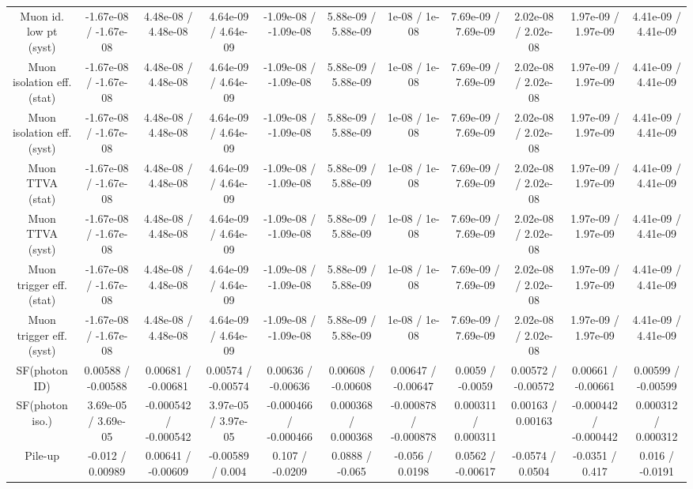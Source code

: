 \begin{table}[htbp]
\begin{center}
\begin{tabular}{|c|c|c|c|c|c|c|c|c|c|c|}
  Muon id. low pt (syst) & -1.67e-08 / -1.67e-08 & 4.48e-08 / 4.48e-08 & 4.64e-09 / 4.64e-09 & -1.09e-08 / -1.09e-08 & 5.88e-09 / 5.88e-09 & 1e-08 / 1e-08 & 7.69e-09 / 7.69e-09 & 2.02e-08 / 2.02e-08 & 1.97e-09 / 1.97e-09 & 4.41e-09 / 4.41e-09 \\ 
  Muon isolation eff. (stat) & -1.67e-08 / -1.67e-08 & 4.48e-08 / 4.48e-08 & 4.64e-09 / 4.64e-09 & -1.09e-08 / -1.09e-08 & 5.88e-09 / 5.88e-09 & 1e-08 / 1e-08 & 7.69e-09 / 7.69e-09 & 2.02e-08 / 2.02e-08 & 1.97e-09 / 1.97e-09 & 4.41e-09 / 4.41e-09 \\ 
  Muon isolation eff. (syst) & -1.67e-08 / -1.67e-08 & 4.48e-08 / 4.48e-08 & 4.64e-09 / 4.64e-09 & -1.09e-08 / -1.09e-08 & 5.88e-09 / 5.88e-09 & 1e-08 / 1e-08 & 7.69e-09 / 7.69e-09 & 2.02e-08 / 2.02e-08 & 1.97e-09 / 1.97e-09 & 4.41e-09 / 4.41e-09 \\ 
  Muon TTVA (stat) & -1.67e-08 / -1.67e-08 & 4.48e-08 / 4.48e-08 & 4.64e-09 / 4.64e-09 & -1.09e-08 / -1.09e-08 & 5.88e-09 / 5.88e-09 & 1e-08 / 1e-08 & 7.69e-09 / 7.69e-09 & 2.02e-08 / 2.02e-08 & 1.97e-09 / 1.97e-09 & 4.41e-09 / 4.41e-09 \\ 
  Muon TTVA (syst) & -1.67e-08 / -1.67e-08 & 4.48e-08 / 4.48e-08 & 4.64e-09 / 4.64e-09 & -1.09e-08 / -1.09e-08 & 5.88e-09 / 5.88e-09 & 1e-08 / 1e-08 & 7.69e-09 / 7.69e-09 & 2.02e-08 / 2.02e-08 & 1.97e-09 / 1.97e-09 & 4.41e-09 / 4.41e-09 \\ 
  Muon trigger eff. (stat) & -1.67e-08 / -1.67e-08 & 4.48e-08 / 4.48e-08 & 4.64e-09 / 4.64e-09 & -1.09e-08 / -1.09e-08 & 5.88e-09 / 5.88e-09 & 1e-08 / 1e-08 & 7.69e-09 / 7.69e-09 & 2.02e-08 / 2.02e-08 & 1.97e-09 / 1.97e-09 & 4.41e-09 / 4.41e-09 \\ 
  Muon trigger eff. (syst) & -1.67e-08 / -1.67e-08 & 4.48e-08 / 4.48e-08 & 4.64e-09 / 4.64e-09 & -1.09e-08 / -1.09e-08 & 5.88e-09 / 5.88e-09 & 1e-08 / 1e-08 & 7.69e-09 / 7.69e-09 & 2.02e-08 / 2.02e-08 & 1.97e-09 / 1.97e-09 & 4.41e-09 / 4.41e-09 \\ 
  SF(photon ID) & 0.00588 / -0.00588 & 0.00681 / -0.00681 & 0.00574 / -0.00574 & 0.00636 / -0.00636 & 0.00608 / -0.00608 & 0.00647 / -0.00647 & 0.0059 / -0.0059 & 0.00572 / -0.00572 & 0.00661 / -0.00661 & 0.00599 / -0.00599 \\ 
  SF(photon iso.) & 3.69e-05 / 3.69e-05 & -0.000542 / -0.000542 & 3.97e-05 / 3.97e-05 & -0.000466 / -0.000466 & 0.000368 / 0.000368 & -0.000878 / -0.000878 & 0.000311 / 0.000311 & 0.00163 / 0.00163 & -0.000442 / -0.000442 & 0.000312 / 0.000312 \\ 
  Pile-up & -0.012 / 0.00989 & 0.00641 / -0.00609 & -0.00589 / 0.004 & 0.107 / -0.0209 & 0.0888 / -0.065 & -0.056 / 0.0198 & 0.0562 / -0.00617 & -0.0574 / 0.0504 & -0.0351 / 0.417 & 0.016 / -0.0191 \\ 

\end{tabular}
\end{center}
\end{table}
